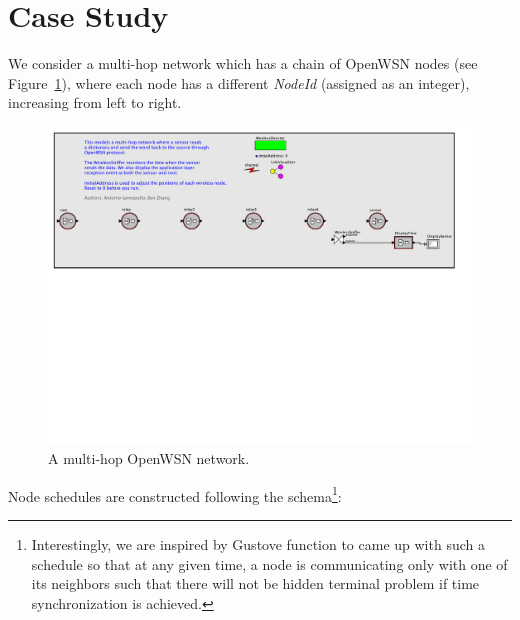 \section{Case Study}
\label{sec:case-study}

We consider a multi-hop network which has a chain of OpenWSN nodes (see Figure~\ref{fig:multihop}), where each node has a different {\em NodeId} (assigned as an integer), increasing from left to right. 
\begin{figure}[t]
\centering
\includegraphics[width=1\columnwidth]{figures/PaperDemoPtolemy}
\caption{A multi-hop OpenWSN network.}
\label{fig:multihop}
\end{figure}
Node schedules are constructed following the schema\footnote{Interestingly, we are inspired by Gustove function to came up with such a schedule so that at any given time, a node is communicating only with one of its neighbors such that there will not be hidden terminal problem if time synchronization is achieved.}:

